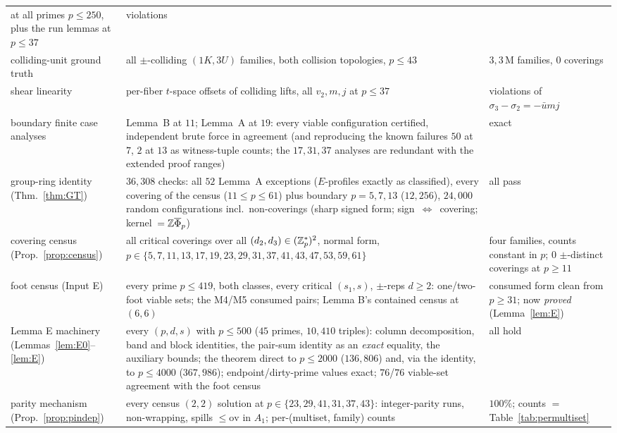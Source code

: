 \begin{longtable}{@{}p{3.7cm}>{\raggedright\arraybackslash}p{8.2cm}>{\raggedright\arraybackslash}p{3.1cm}@{}}
  at all primes $p\le250$, plus the run lemmas at $p\le37$ & 0 violations \\
colliding-unit ground truth & all $\pm$-colliding $(1K,3U)$ families,
  both collision topologies, $p\le43$ & $3{,}3$\,M families, 0 coverings \\
shear linearity & per-fiber $t$-space offsets of colliding lifts,
  all $v_2,m,j$ at $p\le37$ & 0 violations of $\sigma_3-\sigma_2=-\bar u mj$ \\
boundary finite case analyses & Lemma~B at $11$; Lemma~A at $19$: every
  viable configuration certified, independent brute force in
  agreement (and reproducing the known failures $50$ at $7$, $2$ at $13$
  as witness-tuple counts; the $17,31,37$ analyses are redundant with the extended proof ranges) & exact \\
group-ring identity (Thm.~\ref{thm:GT}) & $36{,}308$ checks: all $52$
  Lemma~A exceptions ($E$-profiles exactly as classified), every covering
  of the census ($11\le p\le 61$) plus boundary $p=5,7,13$ ($12{,}256$),
  $24{,}000$ random configurations
  incl.\ non-coverings (sharp signed form; sign~$\Leftrightarrow$~covering;
  kernel~$=\mathbb{Z}\overline\Phi_p$) & all pass \\
covering census (Prop.~\ref{prop:census}) & all critical coverings over
  all $(d_2,d_3)\in(\mathbb{Z}_p^*)^2$, normal form, $p\in\{5,7,11,13,17,19,23,29,31,37,41,43,47,53,59,61\}$
  & four families, counts constant in $p$; $0$ $\pm$-distinct coverings at
  $p\ge11$ \\
foot census (Input E) & every prime $p\le419$, both classes, every
  critical $(s_1,s)$, $\pm$-reps $d\ge2$: one/two-foot viable sets;
  the M4/M5 consumed pairs; Lemma B's contained census at $(6,6)$ &
  consumed form clean from $p\ge31$; now \emph{proved}
  (Lemma~\ref{lem:E}) \\
Lemma E machinery (Lemmas~\ref{lem:E0}--\ref{lem:E}) & every $(p,d,s)$
  with $p\le500$ ($45$ primes, $10{,}410$ triples): column decomposition,
  band and block identities, the pair-sum identity as an \emph{exact}
  equality, the auxiliary bounds; the theorem direct to $p\le2000$
  ($136{,}806$) and, via the identity, to $p\le4000$ ($367{,}986$);
  endpoint/dirty-prime values exact; $76$/$76$ viable-set agreement with
  the foot census & all hold \\
parity mechanism (Prop.~\ref{prop:pindep}) & every census $(2,2)$ solution
  at $p\in\{23,29,41,31,37,43\}$: integer-parity runs, non-wrapping,
  spills $\le\mathrm{ov}$ in $A_1$; per-(multiset, family) counts &
  $100\%$; counts $=$ Table~\ref{tab:permultiset} \\

\end{longtable}
